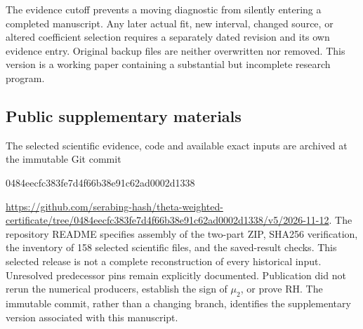 \documentclass[11pt,a4paper]{article}
\numberwithin{equation}{section}
\theoremstyle{definition}\newtheorem{definition}[theorem]{Definition}
\theoremstyle{remark}\newtheorem{remark}[theorem]{Remark}
\begin{document}
The evidence cutoff prevents a moving diagnostic from silently entering a completed manuscript. Any later actual fit, new interval, changed source, or altered coefficient selection requires a separately dated revision and its own evidence entry. Original backup files are neither overwritten nor removed. This version is a working paper containing a substantial but incomplete research program.

\subsection{Public supplementary materials}
The selected scientific evidence, code and available exact inputs are archived at the immutable Git commit
\begin{center}\ttfamily\small
0484eecfc383fe7d4f66b38e91c62ad0002d1338
\end{center}
\noindent\url{https://github.com/serabing-hash/theta-weighted-certificate/tree/0484eecfc383fe7d4f66b38e91c62ad0002d1338/v5/2026-11-12}.
The repository README specifies assembly of the two-part ZIP, SHA256 verification, the inventory of 158 selected scientific files, and the saved-result checks. This selected release is not a complete reconstruction of every historical input. Unresolved predecessor pins remain explicitly documented. Publication did not rerun the numerical producers, establish the sign of $\mu_2$, or prove RH. The immutable commit, rather than a changing branch, identifies the supplementary version associated with this manuscript.
\end{document}
